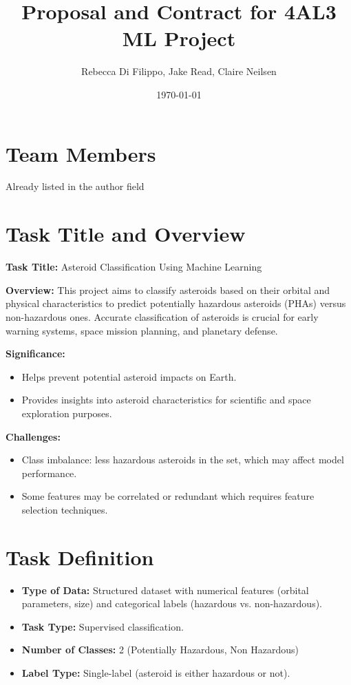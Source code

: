 \documentclass{article}
\title{Proposal and Contract for 4AL3 ML Project}
\author{Rebecca Di Filippo, Jake Read, Claire Neilsen}
\date{\today}
\begin{document}
\maketitle

\section{Team Members}
\raggedright Already listed in the author field

\section{Task Title and Overview}
\textbf{Task Title:} Asteroid Classification Using Machine Learning

\textbf{Overview:} 
This project aims to classify asteroids based on their orbital and physical characteristics to predict potentially hazardous asteroids (PHAs) versus non-hazardous ones. 
Accurate classification of asteroids is crucial for early warning systems, space mission planning, and planetary defense.

\textbf{Significance:}
\begin{itemize}
    \item Helps prevent potential asteroid impacts on Earth.
    \item Provides insights into asteroid characteristics for scientific and space exploration purposes.
\end{itemize}

\textbf{Challenges:}
\begin{itemize}
    \item Class imbalance: less hazardous asteroids in the set, which may affect model performance.
    \item Some features may be correlated or redundant which requires feature selection techniques.
\end{itemize}

\section{Task Definition}
\begin{itemize}
    \item \textbf{Type of Data:} Structured dataset with numerical features (orbital parameters, size) and categorical labels (hazardous vs. non-hazardous).
    \item \textbf{Task Type:} Supervised classification.
    \item \textbf{Number of Classes:} 2 (Potentially Hazardous, Non Hazardous)
    \item \textbf{Label Type:} Single-label (asteroid is either hazardous or not).
\end{itemize}
\end{document}
